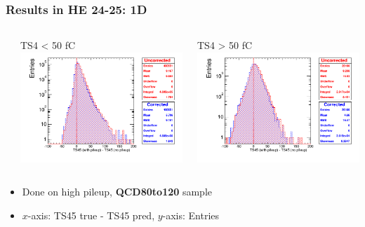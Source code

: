 \documentclass[bigger]{beamer}
\providecommand{\alert}[1]{\textbf{#1}}
\begin{document}
\begin{frame}
\frametitle{Results in HE 24-25: 1D}
\label{sec-3-3-15}
\begin{columns} %
\label{sec-3-3-15-1}
\begin{column}{0.55\textwidth}
\label{sec-3-3-15-1-1}

\centering
TS4 < 50 fC
\includegraphics[width=\textwidth]{fig/correction_comparison_1D_sample80to120_under50_ring3.png}
\end{column}
\begin{column}{0.55\textwidth}
\label{sec-3-3-15-1-2}

\centering
TS4 > 50 fC
\includegraphics[width=\textwidth]{fig/correction_comparison_1D_sample80to120_over50_ring3.png}
\end{column}
\end{columns}
\label{sec-3-3-15-2}
\begin{itemize}

\item Done on high pileup, \alert{QCD80to120} sample
\label{sec-3-3-15-2-1}%

\item $x$-axis: TS45 true - TS45 pred, $y$-axis: Entries
\label{sec-3-3-15-2-2}%
\end{itemize} %
\end{frame}
\end{document}
